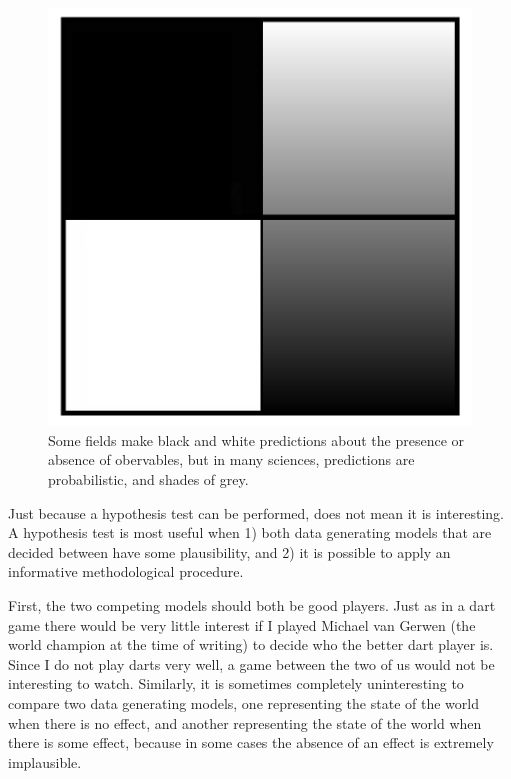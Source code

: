 \documentclass[
]{krantz}
\begin{document}
\begin{figure}

{\centering \includegraphics[width=1\linewidth]{images/blackwhite} 

}

\caption{Some fields make black and white predictions about the presence or absence of obervables, but in many sciences, predictions are probabilistic, and shades of grey.}\label{fig:blackwhite}
\end{figure}

Just because a hypothesis test can be performed, does not mean it is interesting. A hypothesis test is most useful when 1) both data generating models that are decided between have some plausibility, and 2) it is possible to apply an informative methodological procedure.

First, the two competing models should both be good players. Just as in a dart game there would be very little interest if I played Michael van Gerwen (the world champion at the time of writing) to decide who the better dart player is. Since I do not play darts very well, a game between the two of us would not be interesting to watch. Similarly, it is sometimes completely uninteresting to compare two data generating models, one representing the state of the world when there is no effect, and another representing the state of the world when there is some effect, because in some cases the absence of an effect is extremely implausible.
\end{document}

